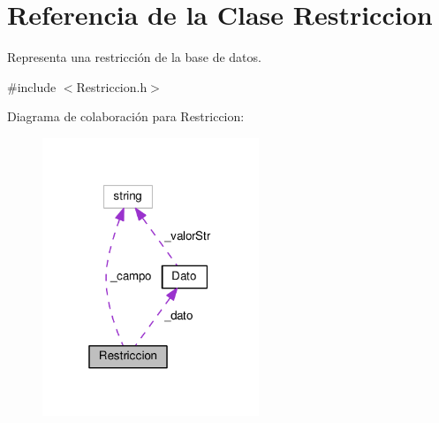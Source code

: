 \hypertarget{classRestriccion}{\section{Referencia de la Clase Restriccion}
\label{classRestriccion}
}


Representa una restricción de la base de datos.  




{\ttfamily \#include $<$Restriccion.\-h$>$}



Diagrama de colaboración para Restriccion\-:\nopagebreak
\begin{figure}[H]
\begin{center}
\leavevmode
\includegraphics[width=184pt]{classRestriccion__coll__graph}
\end{center}
\end{figure}
